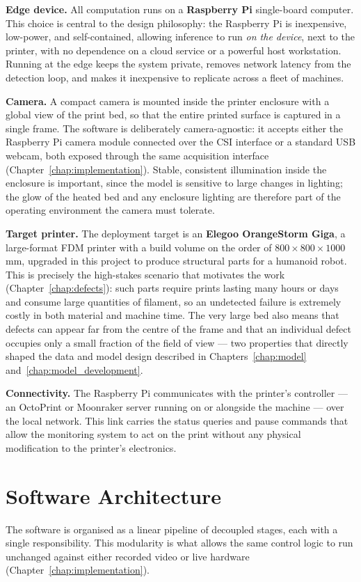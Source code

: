\documentclass[english, Lau, oneside]{sapthesis}
\begin{document}
\textbf{Edge device.} All computation runs on a \textbf{Raspberry Pi} single-board computer. This choice is central to the design philosophy: the Raspberry Pi is inexpensive, low-power, and self-contained, allowing inference to run \textit{on the device}, next to the printer, with no dependence on a cloud service or a powerful host workstation. Running at the edge keeps the system private, removes network latency from the detection loop, and makes it inexpensive to replicate across a fleet of machines.

\textbf{Camera.} A compact camera is mounted inside the printer enclosure with a global view of the print bed, so that the entire printed surface is captured in a single frame. The software is deliberately camera-agnostic: it accepts either the Raspberry Pi camera module connected over the CSI interface or a standard USB webcam, both exposed through the same acquisition interface (Chapter~\ref{chap:implementation}). Stable, consistent illumination inside the enclosure is important, since the model is sensitive to large changes in lighting; the glow of the heated bed and any enclosure lighting are therefore part of the operating environment the camera must tolerate.

\textbf{Target printer.} The deployment target is an \textbf{Elegoo OrangeStorm Giga}, a large-format FDM printer with a build volume on the order of $800 \times 800 \times 1000$\,mm, upgraded in this project to produce structural parts for a humanoid robot. This is precisely the high-stakes scenario that motivates the work (Chapter~\ref{chap:defects}): such parts require prints lasting many hours or days and consume large quantities of filament, so an undetected failure is extremely costly in both material and machine time. The very large bed also means that defects can appear far from the centre of the frame and that an individual defect occupies only a small fraction of the field of view --- two properties that directly shaped the data and model design described in Chapters~\ref{chap:model} and~\ref{chap:model_development}.

\textbf{Connectivity.} The Raspberry Pi communicates with the printer's controller --- an OctoPrint or Moonraker server running on or alongside the machine --- over the local network. This link carries the status queries and pause commands that allow the monitoring system to act on the print without any physical modification to the printer's electronics.

\section{Software Architecture}
The software is organised as a linear pipeline of decoupled stages, each with a single responsibility. This modularity is what allows the same control logic to run unchanged against either recorded video or live hardware (Chapter~\ref{chap:implementation}).
\end{document}
